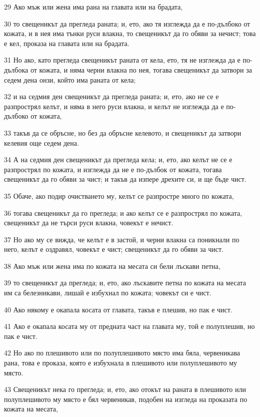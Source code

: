 \par 29 Ако мъж или жена има рана на главата или на брадата,
\par 30 то свещеникът да прегледа раната; и, ето, ако тя изглежда да е по-дълбоко от кожата, и в нея има тънки руси влакна, то свещеникът да го обяви за нечист; това е кел, проказа на главата или на брадата.
\par 31 Но ако, като прегледа свещеникът раната от кела, ето, тя не изглежда да е по-дълбока от кожата, и няма черни влакна по нея, тогава свещеникът да затвори за седем дена онзи, който има раната от кела;
\par 32 и на седмия ден свещеникът да прегледа раната; и, ето, ако не се е разпрострял келът, и няма в него руси влакна, и келът не изглежда да е по-дълбоко от кожата,
\par 33 такъв да се обръсне, но без да обръсне келевото, и свещеникът да затвори келевия още седем дена.
\par 34 А на седмия ден свещеникът да прегледа кела; и, ето, ако келът не се е разпрострял по кожата, и изглежда да не е по-дълбок от кожата, тогава свещеникът да го обяви за чист; и такъв да изпере дрехите си, и ще бъде чист.
\par 35 Обаче, ако подир очистването му, келът се разпростре много по кожата,
\par 36 тогава свещеникът да го прегледа; и ако келът се е разпрострял по кожата, свещеникът да не търси руси влакна, човекът е нечист.
\par 37 Но ако му се вижда, че келът е в застой, и черни влакна са поникнали по него, келът е оздравял, човекът е чист; свещеникът да го обяви за чист.
\par 38 Ако мъж или жена има по кожата на месата си бели лъскави петна,
\par 39 то свещеникът да прегледа; и, ето, ако лъскавите петна по кожата на месата им са белезникави, лишай е избухнал по кожата; човекът си е чист.
\par 40 Ако някому е окапала косата от главата, такъв е плешив, но пак е чист.
\par 41 Ако е окапала косата му от предната част на главата му, той е полуплешив, но пак е чист.
\par 42 Но ако по плешивото или по полуплешивото място има бяла, червеникава рана, това е проказа, която е избухнала в плешивото или полуплешивото му място.
\par 43 Свещеникът нека го прегледа; и, ето, ако отокът на раната в плешивото или полуплешивото му място е бял червеникав, подобен на изгледа на проказата по кожата на месата,
